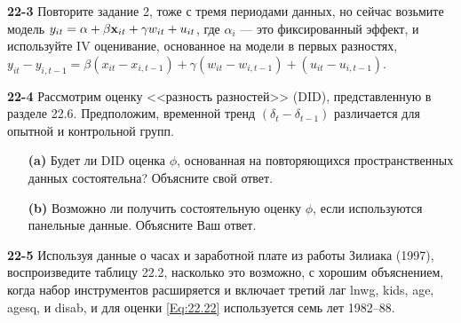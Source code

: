 \textbf{22-3} Повторите задание 2, тоже с тремя периодами данных, но сейчас возьмите модель $y_{it}=\alpha + \beta \mathbf{x}_{it}+\gamma w_{it}+u_{it}$, где $\alpha_i$  --- это фиксированный эффект, и используйте IV оценивание, основанное на модели в первых разностях, $y_{it}-y_{i,t-1}=\beta (x_{it} - x_{i,t-1})+\gamma (w_{it}-w_{i,t-1})+(u_{it}-u_{i,t-1})$.

\textbf{22-4} Рассмотрим оценку <<разность разностей>> (DID), представленную в разделе  22.6. Предположим, временной тренд $(\delta_t-\delta_{t-1})$ различается для опытной и контрольной групп.
\begin{itemize}
\item[{\bf (a)}] Будет ли DID оценка $\phi$, основанная на повторяющихся пространственных данных состоятельна? Объясните свой ответ.
\item[{\bf (b)}] Возможно ли получить состоятельную оценку $\phi$, если используются панельные данные. Объясните Ваш ответ.
\end{itemize}
 
\textbf{22-5} Используя данные о часах и заработной плате из работы Зилиака (1997), воспроизведите таблицу 22.2, насколько это возможно, с хорошим объяснением, когда набор инструментов расширяется и включает третий лаг lnwg, kids, age, agesq, и disab, и для оценки \ref{Eq:22.22} используется семь лет 1982–88.

 
